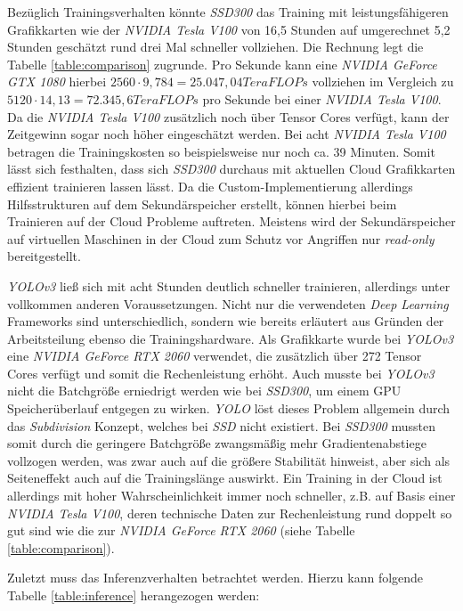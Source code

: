 Bezüglich Trainingsverhalten könnte \textit{SSD300} das Training mit leistungsfähigeren Grafikkarten wie der \textit{NVIDIA Tesla V100} von 16,5 Stunden auf umgerechnet 5,2 Stunden geschätzt rund drei Mal schneller vollziehen. Die Rechnung legt die Tabelle \ref{table:comparison} zugrunde. Pro Sekunde kann eine \textit{NVIDIA GeForce GTX 1080} hierbei $2560\cdot 9,784 = 25.047,04 TeraFLOPs$ vollziehen im Vergleich zu $5120\cdot 14,13 = 72.345,6 TeraFLOPs$ pro Sekunde bei einer \textit{NVIDIA Tesla V100}. Da die \textit{NVIDIA Tesla V100} zusätzlich noch über Tensor Cores verfügt, kann der Zeitgewinn sogar noch höher eingeschätzt werden. Bei acht \textit{NVIDIA Tesla V100} betragen die Trainingskosten so beispielsweise nur noch ca. 39 Minuten. Somit lässt sich festhalten, dass sich \textit{SSD300} durchaus mit aktuellen Cloud Grafikkarten effizient trainieren lassen lässt. Da die Custom-Implementierung allerdings Hilfsstrukturen auf dem Sekundärspeicher erstellt, können hierbei beim Trainieren auf der Cloud Probleme auftreten. Meistens wird der Sekundärspeicher auf virtuellen Maschinen in der Cloud zum Schutz vor Angriffen nur \textit{read-only} bereitgestellt. 

\textit{YOLOv3} ließ sich mit acht Stunden deutlich schneller trainieren, allerdings unter vollkommen anderen Voraussetzungen. Nicht nur die verwendeten \textit{Deep Learning} Frameworks sind unterschiedlich, sondern wie bereits erläutert aus Gründen der Arbeitsteilung ebenso die Trainingshardware. Als Grafikkarte wurde bei \textit{YOLOv3} eine \textit{NVIDIA GeForce RTX 2060} verwendet, die zusätzlich über 272 Tensor Cores verfügt und somit die Rechenleistung erhöht. Auch musste bei \textit{YOLOv3} nicht die Batchgröße erniedrigt werden wie bei \textit{SSD300}, um einem GPU Speicherüberlauf entgegen zu wirken. \textit{YOLO} löst dieses Problem allgemein durch das \textit{Subdivision} Konzept, welches bei \textit{SSD} nicht existiert. Bei \textit{SSD300} mussten somit durch die geringere Batchgröße zwangsmäßig mehr Gradientenabstiege vollzogen werden, was zwar auch auf die größere Stabilität hinweist, aber sich als Seiteneffekt auch auf die Trainingslänge auswirkt. Ein Training in der Cloud ist allerdings mit hoher Wahrscheinlichkeit immer noch schneller, z.B. auf Basis einer \textit{NVIDIA Tesla V100}, deren technische Daten zur Rechenleistung rund doppelt so gut sind wie die zur \textit{NVIDIA GeForce RTX 2060} (siehe Tabelle \ref{table:comparison}). 

Zuletzt muss das Inferenzverhalten betrachtet werden. Hierzu kann folgende Tabelle \ref{table:inference} herangezogen werden:

